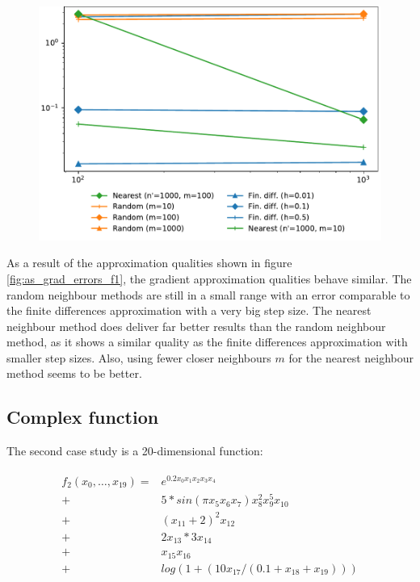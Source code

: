 \documentclass[
  a4paper,  %
  twoside,  %
  bibliography=totoc,
  headsepline,
  cleardoublepage=empty,
  parskip=half,
  draft=false
]{scrbook}
\begin{document}
\begin{figure}[H]
\begin{center}
	\includegraphics[width=\textwidth]{graphics/as_errors_f1}
\end{center}
	\label{fig:as_errors_f1}
\end{figure}

As a result of the approximation qualities shown in figure \ref{fig:as_grad_errors_f1}, the gradient approximation qualities behave similar.
The random neighbour methods are still in a small range with an error comparable to the finite differences approximation with a very big step size.
The nearest neighbour method does deliver far better results than the random neighbour method, as it shows a similar quality as the finite differences approximation with smaller step sizes.
Also, using fewer closer neighbours $m$ for the nearest neighbour method seems to be better.

\newpage

\subsection{Complex function}

The second case study is a 20-dimensional function:

\begin{align}
\begin{split}
f_2(x_0, \dots, x_{19})=&e^{0.2 x_0 x_1 x_2 x_3 x_4}\\
+ &5 * sin(\pi x_5 x_6 x_7) x_8^2 x_9^5 x_{10}\\
+ &(x_{11} + 2)^2 x_{12}\\
+ &2 x_{13} * 3 x_{14}\\
+ &x_{15} x_{16}\\
+ &log(1 + (10 x_{17} / (0.1 + x_{18} + x_{19})))
\end{split}
\end{align}
\end{document}
